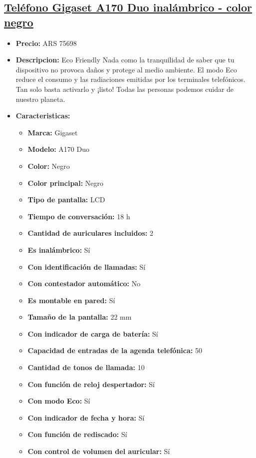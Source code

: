 \documentclass{article}
\begin{document}
    
    \begin{adjustwidth}{2em}{}

    \subsection{\underline{\href{https://www.mercadolibre.com.ar/telefono-gigaset-a170-duo-inalambrico-color-negro/p/MLA15981667}{Teléfono Gigaset A170 Duo inalámbrico - color negro}}}
    \begin{itemize}
        \item \textbf{Precio:} ARS 75698
        \item \textbf{Descripcion:} Eco Friendly
Nada como la tranquilidad de saber que tu dispositivo no provoca daños y protege al medio ambiente. El modo Eco reduce el consumo y las radiaciones emitidas por los terminales telefónicos. Tan solo basta activarlo y ¡listo! Todas las personas podemos cuidar de nuestro planeta.
        \item \textbf{Caracteristicas:} 
        \begin{itemize}
            \item \textbf {Marca:} Gigaset
    \item \textbf {Modelo:} A170 Duo
    \item \textbf {Color:} Negro
    \item \textbf {Color principal:} Negro
    \item \textbf {Tipo de pantalla:} LCD
    \item \textbf {Tiempo de conversación:} 18 h
    \item \textbf {Cantidad de auriculares incluidos:} 2
    \item \textbf {Es inalámbrico:} Sí
    \item \textbf {Con identificación de llamadas:} Sí
    \item \textbf {Con contestador automático:} No
    \item \textbf {Es montable en pared:} Sí
    \item \textbf {Tamaño de la pantalla:} 22 mm
    \item \textbf {Con indicador de carga de batería:} Sí
    \item \textbf {Capacidad de entradas de la agenda telefónica:} 50
    \item \textbf {Cantidad de tonos de llamada:} 10
    \item \textbf {Con función de reloj despertador:} Sí
    \item \textbf {Con modo Eco:} Sí
    \item \textbf {Con indicador de fecha y hora:} Sí
    \item \textbf {Con función de rediscado:} Sí
    \item \textbf {Con control de volumen del auricular:} Sí
        \end{itemize}
    \end{itemize}

    \vspace{1\baselineskip} %
    \end{adjustwidth}
\end{document}
